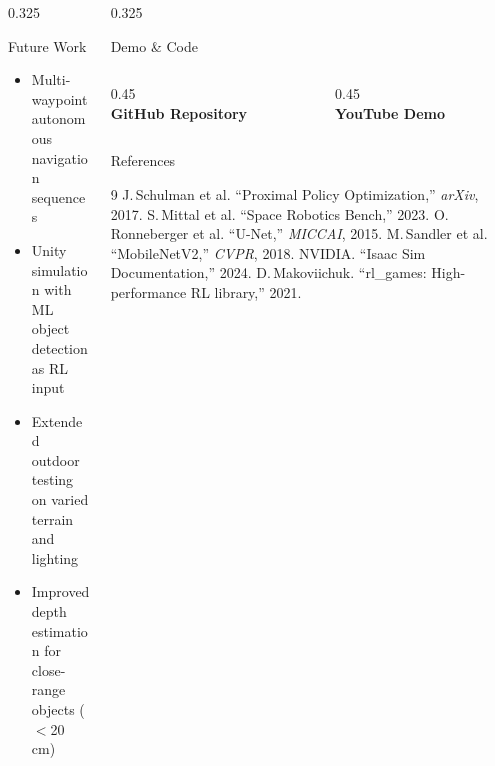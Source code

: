 \documentclass[final]{beamer}
\begin{document}
\begin{frame}[t, fragile]{}
\begin{columns}[t,totalwidth=\textwidth]
\begin{column}{0.325\textwidth}
\begin{block}{Future Work}
\begin{itemize}
  \item Multi-waypoint autonomous navigation sequences
  \item Unity simulation with ML object detection as RL input
  \item Extended outdoor testing on varied terrain and lighting
  \item Improved depth estimation for close-range objects ($<$20\,cm)
\end{itemize}
\end{block}

\end{column}

\begin{column}{0.325\textwidth}

\begin{block}{Demo \& Code}
\centering
\vspace{0.1cm}
\begin{columns}[c]
  \begin{column}{0.45\linewidth}
    \centering
    \\[0.3cm]
    {\normalsize\bfseries GitHub Repository}
  \end{column}
  \begin{column}{0.45\linewidth}
    \centering
    \\[0.3cm]
    {\normalsize\bfseries YouTube Demo}
  \end{column}
\end{columns}
\vspace{0.1cm}
\end{block}

\begin{block}{References}
\small
\begin{thebibliography}{9}\setlength{\itemsep}{0.04cm}
 J.\,Schulman et al. ``Proximal Policy Optimization,'' \emph{arXiv}, 2017.
 S.\,Mittal et al. ``Space Robotics Bench,'' 2023.
 O.\,Ronneberger et al. ``U-Net,'' \emph{MICCAI}, 2015.
 M.\,Sandler et al. ``MobileNetV2,'' \emph{CVPR}, 2018.
 NVIDIA. ``Isaac Sim Documentation,'' 2024.
 D.\,Makoviichuk. ``rl\_games: High-performance RL library,'' 2021.
\end{thebibliography}
\normalsize
\end{block}

\end{column}
\end{columns}

\end{frame}
\end{document}
